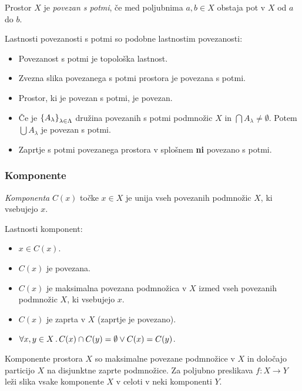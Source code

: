 \begin{definicija}
    Prostor $X$ je \emph{povezan s potmi}, če med poljubnima $a, b \in X$ obstaja pot v $X$ od $a$ do $b$.
\end{definicija}

Lastnosti povezanosti s potmi so podobne lastnostim povezanosti:
\begin{itemize}
    \item Povezanost s potmi je topološka lastnost.
    \item Zvezna slika povezanega s potmi prostora je povezana s potmi.
    \item Prostor, ki je povezan s potmi, je povezan.
    \item Če je $\left\{A_\lambda\right\}_{\lambda \in \Lambda}$ družina povezanih s potmi podmnožic $X$ in $\bigcap A_\lambda \neq \emptyset$. Potem $\bigcup A_\lambda$ je povezan s potmi.
    \item Zaprtje s potmi povezanega prostora v splošnem \textbf{ni} povezano s potmi.
\end{itemize}

\subsubsection{Komponente}
\begin{definicija}
    \emph{Komponenta} $C(x)$ točke $x \in X$ je unija vseh povezanih podmnožic $X$, ki vsebujejo $x$.
\end{definicija}
\begin{trditev}
    Lastnosti komponent:
    \begin{itemize}
        \item $x \in C(x)$.
        \item $C(x)$ je povezana.
        \item $C(x)$ je maksimalna povezana podmnožica v $X$ izmed vseh povezanih podmnožic $X$, ki vsebujejo $x$.
        \item $C(x)$ je zaprta v $X$ (zaprtje je povezano).
        \item $\forall x, y \in X \,.\, C(x) \cap C(y) = \emptyset \lor C(x) = C(y)$.
    \end{itemize}
\end{trditev}

\begin{izrek}
    Komponente prostora $X$ so maksimalne povezane podmnožice v $X$ in določajo particijo $X$ na disjunktne zaprte podmnožice. Za poljubno preslikava $f: X \to Y$ leži slika vsake komponente $X$ v celoti v neki komponenti $Y$.
\end{izrek}

